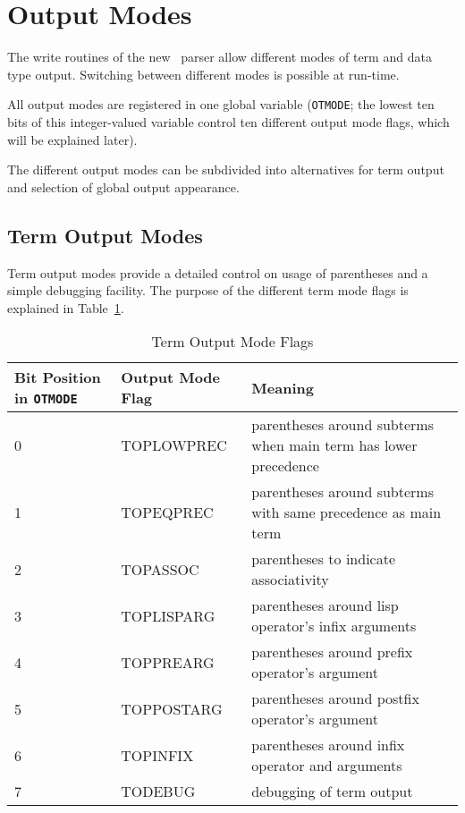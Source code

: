 \section{Output Modes}

The write routines of the new \redux\ parser allow different modes
of term and data type output. 
Switching between different modes is possible at run-time.

All output modes are registered in one global variable ({\tt OTMODE};
the lowest ten bits of this integer-valued variable control ten
different output mode flags, which will be explained later).

The different output modes can be subdivided into alternatives for
term output and selection of global output appearance.

\subsection{Term Output Modes}
Term output modes provide a detailed control on usage of parentheses
and a simple debugging facility. The purpose of the different term
mode flags is explained in Table~\ref{tomodes}.

\begin{table}[htbp]
\begin{center}
\begin{tabular}{|p{0.8in}|l|p{2.5in}|}
\hline
Bit Position in {\tt OTMODE} & Output Mode Flag & Meaning \\
\hline \hline
0 & TOPLOWPREC &  parentheses around subterms when main term has lower
     precedence \\ \hline
1 & TOPEQPREC & parentheses around subterms with same precedence
     as main term \\ \hline
2 & TOPASSOC & parentheses to indicate associativity \\ \hline
3 & TOPLISPARG & parentheses around lisp operator's infix arguments \\ \hline
4 & TOPPREARG & parentheses around prefix operator's argument \\ \hline
5 & TOPPOSTARG & parentheses around postfix operator's argument \\ \hline
6 & TOPINFIX & parentheses around infix operator and arguments \\ \hline
7 & TODEBUG & debugging of term output \\ \hline
\end{tabular}
\end{center}
\caption{Term Output Mode Flags}
\label{tomodes}
\end{table}

